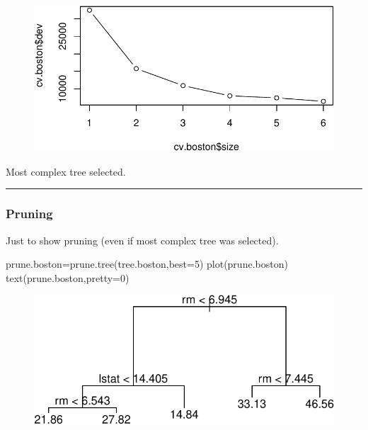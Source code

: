 \documentclass[
  letterpaper,
  DIV=11,
  numbers=noendperiod]{scrartcl}
\newenvironment{Shaded}{\begin{snugshade}}{\end{snugshade}}
\newcommand{\AttributeTok}[1]{\textcolor[rgb]{0.40,0.45,0.13}{#1}}
\newcommand{\DecValTok}[1]{\textcolor[rgb]{0.68,0.00,0.00}{#1}}
\newcommand{\FunctionTok}[1]{\textcolor[rgb]{0.28,0.35,0.67}{#1}}
\newcommand{\NormalTok}[1]{\textcolor[rgb]{0.00,0.23,0.31}{#1}}
\newcommand{\OtherTok}[1]{\textcolor[rgb]{0.00,0.23,0.31}{#1}}
\begin{document}
\begin{figure}[H]

{\centering \includegraphics{L13_files/figure-pdf/unnamed-chunk-8-1.pdf}

}

\end{figure}

Most complex tree selected.

\begin{center}\rule{0.5\linewidth}{0.5pt}\end{center}

\hypertarget{pruning-1}{%
\subsubsection{Pruning}\label{pruning-1}}

Just to show pruning (even if most complex tree was selected).

\begin{Shaded}
\begin{Highlighting}[]
\NormalTok{prune.boston}\OtherTok{=}\FunctionTok{prune.tree}\NormalTok{(tree.boston,}\AttributeTok{best=}\DecValTok{5}\NormalTok{)}
\FunctionTok{plot}\NormalTok{(prune.boston)}
\FunctionTok{text}\NormalTok{(prune.boston,}\AttributeTok{pretty=}\DecValTok{0}\NormalTok{)}
\end{Highlighting}
\end{Shaded}

\begin{figure}[H]

{\centering \includegraphics{L13_files/figure-pdf/unnamed-chunk-9-1.pdf}

}

\end{figure}
\end{document}
